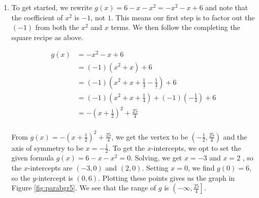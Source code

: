 {\begin{enumerate}
Of course, we can always check our answer by multiplying out $f(x) = (x-2)^2 -1$ to see that it simplifies to $f(x) = x^2 - 4x - 1$. In the form $f(x) = (x-2)^2-1$, we readily find the vertex to be $(2,-1)$ which makes the axis of symmetry $x = 2$.  To find the $x$-intercepts, we set $y = f(x) = 0$.  We are spoiled for choice, since we have \textit{two} formulas for $f(x)$.  Since we recognize $f(x) = x^2-4x+3$ to be easily factorable, (experience pays off, here!) we proceed to solve $x^2-4x+3 = 0$.  Factoring gives $(x-3)(x-1) = 0$ so that $x = 3$ or $x=1$.  The $x$-intercepts are then $(1,0)$ and $(3,0)$.  To find the $y$-intercept, we set $x=0$.  Once again, the general form $f(x) = x^2-4x+3$ is easiest to work with here,  and we find $y = f(0) = 3$.  Hence, the $y$-intercept is $(0,3)$.  With the vertex, axis of symmetry and the intercepts, we get a pretty good graph without the need to plot additional points.  We see that the range of $f$ is $[-1,\infty)$ and we are done. The graph of $f$ is given in Figure \ref{fig:parabgr4}.

\drawexampleline

\item  To get started, we rewrite $g(x) = 6-x-x^2 = -x^2-x+6$ and note that the coefficient of $x^2$ is $-1$, not $1$.  This means our first step is to factor out the $(-1)$ from both the $x^2$ and $x$ terms.  We then follow the completing the square recipe as above. 

\begin{align*}
g(x) & =  -x^2-x+6  \\
	   & = (-1)\left(x^2 + x \right) + 6  \tag*{(Factor the coefficient of $x^2$ from $x^2$ and $x$.)} \\
		 & = (-1)\left(x^2 + x + \underline{\frac{1}{4}} - \underline{\frac{1}{4}} \right) + 6  \\
		 & =  (-1)\left(x^2 + x + \frac{1}{4}\right) + (-1)\left(-\frac{1}{4}\right) + 6  \tag*{(Group the perfect square trinomial.)}\\
		  & =  -\left(x +\frac{1}{2}\right)^2 + \frac{25}{4} \\
\end{align*}


From $g(x) =  -\left(x +\frac{1}{2}\right)^2 + \frac{25}{4}$, we get the vertex to be $\left(-\frac{1}{2}, \frac{25}{4}\right)$ and the axis of symmetry to be $x = -\frac{1}{2}$.  To get the $x$-intercepts, we opt to set the given formula $g(x) = 6-x-x^2 = 0$.  Solving, we get $x = -3$ and $x=2$ , so the $x$-intercepts are $(-3,0)$ and $(2,0)$.  Setting $x=0$, we find $g(0) = 6$, so the $y$-intercept is $(0,6)$. Plotting these points gives us the graph in Figure \ref{fig:parabgr5}.  We see that the range of $g$ is $\left(-\infty, \frac{25}{4}\right]$.
\end{enumerate}
}

